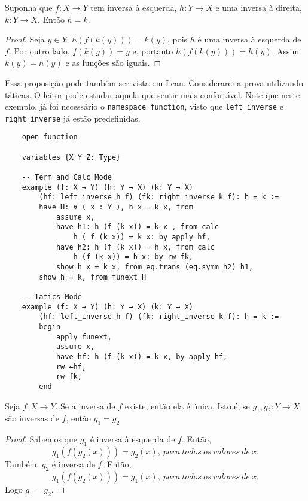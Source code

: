 \begin{theorem}
    \label{prop2}
    Suponha que $f : X \to Y $ tem inversa à esquerda, $h : Y \to X $ e uma inversa à direita, $k : Y \to X $.
    Então $h = k$. 
\end{theorem}
\begin{proof}
    Seja $y \in Y$. $h(f(k(y))) = k(y)$, pois $h$ é uma inversa à esquerda de $f$. 
    Por outro lado, $f(k(y)) = y$ e, portanto $h(f(k(y))) = h(y)$. Assim $k(y) = h(y) $ e as funções são iguais. 
\end{proof}

Essa proposição pode também ser vista em Lean. Considerarei a prova utilizando táticas. O leitor pode estudar 
aquela que sentir mais confortável. Note que neste exemplo, já foi necessário o \lstinline{namespace function}, 
visto que \lstinline{left_inverse} e \lstinline{right_inverse} já estão predefinidas. 

\begin{lstlisting}
    open function 

    variables {X Y Z: Type}

    -- Term and Calc Mode
    example (f: X → Y) (h: Y → X) (k: Y → X) 
        (hf: left_inverse h f) (fk: right_inverse k f): h = k :=
        have H: ∀ ( x : Y ), h x = k x, from 
            assume x, 
            have h1: h (f (k x)) = k x , from calc
                h ( f (k x)) = k x: by apply hf, 
            have h2: h (f (k x)) = h x, from calc
                h (f (k x)) = h x: by rw fk,         
            show h x = k x, from eq.trans (eq.symm h2) h1,
        show h = k, from funext H

    -- Tatics Mode
    example (f: X → Y) (h: Y → X) (k: Y → X) 
        (hf: left_inverse h f) (fk: right_inverse k f): h = k :=
        begin
            apply funext, 
            assume x, 
            have hf: h (f (k x)) = k x, by apply hf, 
            rw ←hf,
            rw fk, 
        end
\end{lstlisting}

\begin{theorem}
    \label{prop3}
    Seja $f: X \to Y$. Se a inversa de $f$ existe, então ela é única. Isto é, se $g_1, g_2: Y \to X$ são inversas 
    de $f$, então $g_1 = g_2$        
\end{theorem}   
\begin{proof}
    Sabemos que $g_1$ é inversa à esquerda de $f$. Então, 
    $$g_1(f(g_2(x))) = g_2(x), ~para~todos~os~valores~de~x.$$ 
    Também, $g_2$ é inversa de $f$. Então, 
    $$g_1(f(g_2(x))) = g_1(x), ~para~todos~os~valores~de~x.$$ Logo $g_1 = g_2$. 
\end{proof}

